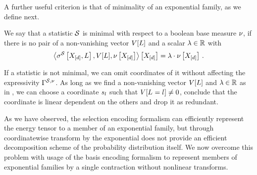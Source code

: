 A further useful criterion is that of minimality of an exponential family, as we define next.

\begin{definition}
    \label{def:minimalStatistics}
    We say that a statistic $\mathcal{S}$ is minimal with respect to a boolean base measure $\nu$, if there is no pair of a non-vanishing vector $V[L]$ and a scalar $\lambda\in\mathbb{R}$ with
    \begin{align*}
        \left\langle \sigma^{\mathcal{S}}\left[X_{[d]},L\right],V[L],\nu\left[X_{[d]}\right]\right\rangle \left[ X_{[d]} \right] = \lambda\cdot\nu\left[X_{[d]}\right] \, .
    \end{align*}
\end{definition}

If a statistic is not minimal, we can omit coordinates of it without affecting the expressivity $\Gamma^{\mathcal{S},\nu}$.
As long as we find a non-vanishing vector $V[L]$ and $\lambda\in\mathbb{R}$ as in , we can choose a coordinate $s_{l}$ such that $V[L_{}=l_{}]\neq0$, conclude that the coordinate is linear dependent on the others and drop it as redundant.



As we have observed, the selection encoding formalism can efficiently represent the energy tensor to a member of an exponential family, but through coordinatewise transform by the exponential does not provide an efficient decomposition scheme of the probability distribution itself.
We now overcome this problem with usage of the basis encoding formalism to represent members of exponential families by a single contraction without nonlinear transforms.

